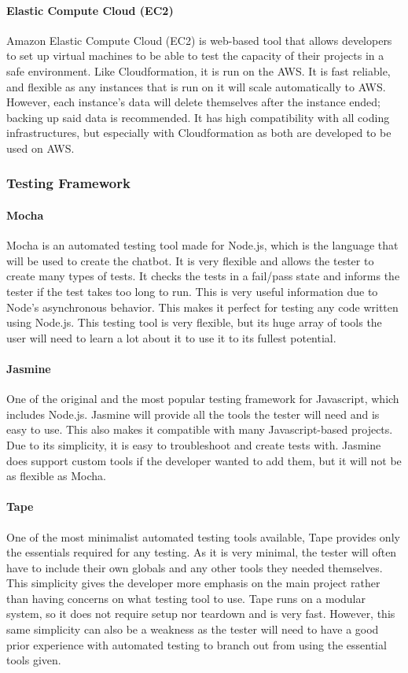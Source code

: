 \paragraph{Elastic Compute Cloud (EC2)}
Amazon Elastic Compute Cloud (EC2) is web-based tool that allows developers to set up virtual machines to be able to test the capacity of their projects in a safe environment. 
Like Cloudformation, it is run on the AWS. 
It is fast reliable, and flexible as any instances that is run on it will scale automatically to AWS.
However, each instance's data will delete themselves after the instance ended; backing up said data is recommended. 
It has high compatibility with all coding infrastructures, but especially with Cloudformation as both are developed to be used on AWS.

\subsubsection{Testing  Framework}
\paragraph{Mocha}
Mocha is an automated testing tool made for Node.js, which is the language that will be used to create the chatbot. 
It is very flexible and allows the tester to create many types of tests.
It checks the tests in a fail/pass state and informs the tester if the test takes too long to run. 
This is very useful information due to Node's asynchronous behavior. 
This makes it perfect for testing any code written using Node.js. 
This testing tool is very flexible, but its huge array of tools the user will need to learn a lot about it to use it to its fullest potential.
\paragraph{Jasmine}
One of the original and the most popular testing framework for Javascript, which includes Node.js.
Jasmine will provide all the tools the tester will need and is easy to use. 
This also makes it compatible with many Javascript-based projects. 
Due to its simplicity, it is easy to troubleshoot and create tests with.
Jasmine does support custom tools if the developer wanted to add them, but it will not be as flexible as Mocha.
\paragraph{Tape}
One of the most minimalist automated testing tools available, Tape provides only the essentials required for any testing. 
As it is very minimal, the tester will often have to include their own globals and any other tools they needed themselves. 
This simplicity gives the developer more emphasis on the main project rather than having concerns on what testing tool to use. 
Tape runs on a modular system, so it does not require setup nor teardown and is very fast.
However, this same simplicity can also be a weakness as the tester will need to have a good prior experience with automated testing to branch out from using the essential tools given.

